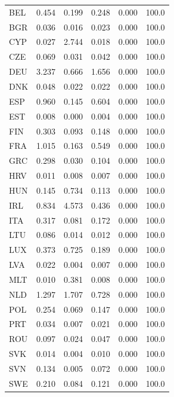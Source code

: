 {\begin{longtable}{@{}lrrrrr@{}}
BEL & 0.454 & 0.199 & 0.248 & 0.000 & 100.0 \\
BGR & 0.036 & 0.016 & 0.023 & 0.000 & 100.0 \\
CYP & 0.027 & 2.744 & 0.018 & 0.000 & 100.0 \\
CZE & 0.069 & 0.031 & 0.042 & 0.000 & 100.0 \\
DEU & 3.237 & 0.666 & 1.656 & 0.000 & 100.0 \\
DNK & 0.048 & 0.022 & 0.022 & 0.000 & 100.0 \\
ESP & 0.960 & 0.145 & 0.604 & 0.000 & 100.0 \\
EST & 0.008 & 0.000 & 0.004 & 0.000 & 100.0 \\
FIN & 0.303 & 0.093 & 0.148 & 0.000 & 100.0 \\
FRA & 1.015 & 0.163 & 0.549 & 0.000 & 100.0 \\
GRC & 0.298 & 0.030 & 0.104 & 0.000 & 100.0 \\
HRV & 0.011 & 0.008 & 0.007 & 0.000 & 100.0 \\
HUN & 0.145 & 0.734 & 0.113 & 0.000 & 100.0 \\
IRL & 0.834 & 4.573 & 0.436 & 0.000 & 100.0 \\
ITA & 0.317 & 0.081 & 0.172 & 0.000 & 100.0 \\
LTU & 0.086 & 0.014 & 0.012 & 0.000 & 100.0 \\
LUX & 0.373 & 0.725 & 0.189 & 0.000 & 100.0 \\
LVA & 0.022 & 0.004 & 0.007 & 0.000 & 100.0 \\
MLT & 0.010 & 0.381 & 0.008 & 0.000 & 100.0 \\
NLD & 1.297 & 1.707 & 0.728 & 0.000 & 100.0 \\
POL & 0.254 & 0.069 & 0.147 & 0.000 & 100.0 \\
PRT & 0.034 & 0.007 & 0.021 & 0.000 & 100.0 \\
ROU & 0.097 & 0.024 & 0.047 & 0.000 & 100.0 \\
SVK & 0.014 & 0.004 & 0.010 & 0.000 & 100.0 \\
SVN & 0.134 & 0.005 & 0.072 & 0.000 & 100.0 \\
SWE & 0.210 & 0.084 & 0.121 & 0.000 & 100.0 \\
\end{longtable}
\par{}\par
}
